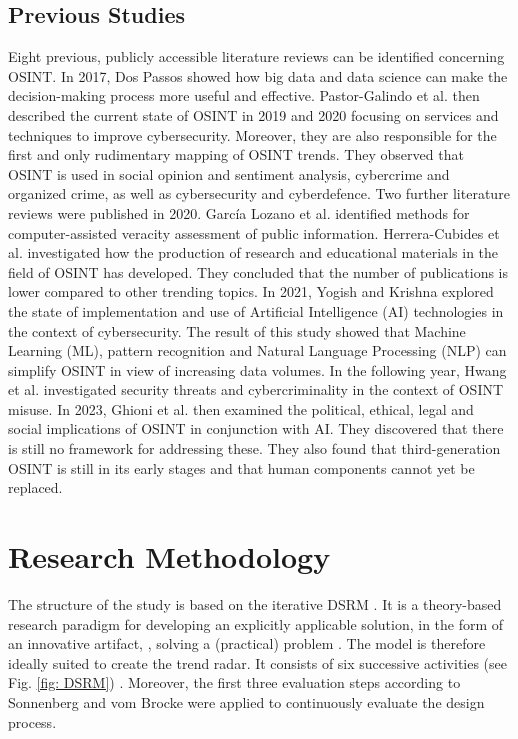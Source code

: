 \documentclass[10pt]{article}
\begin{document}
\subsection{Previous Studies}

Eight previous, publicly accessible literature reviews can be identified
concerning OSINT. In 2017, Dos Passos \cite{DosPassos.2017} showed how big data and data science can
make the decision-making process more useful and effective. Pastor-Galindo et al. then described
the current state of OSINT in 2019 \cite{PastorGalindo.2019} and 2020 \cite{PastorGalindo.2020}
focusing on services and techniques to improve cybersecurity. Moreover, they are also responsible
for the first and only rudimentary mapping of OSINT trends. They observed that OSINT is used in
social opinion and sentiment analysis, cybercrime and organized crime, as well as cybersecurity and cyberdefence.
Two further literature reviews were published in 2020. García Lozano et al. \cite{GarciaLozano.2020} identified
methods for computer-assisted veracity assessment of public information.
Herrera-Cubides et al. \cite{HerreraCubides.2020} investigated how the production of
research and educational materials in the field of OSINT has developed. They concluded that
the number of publications is lower compared to other trending topics. In 2021,
Yogish and Krishna \cite{Yogish.2021} explored the state of implementation and use of
Artificial Intelligence (AI) technologies in the context of cybersecurity. The result of this
study showed that Machine Learning (ML), pattern recognition and Natural Language Processing
(NLP) can simplify OSINT in view of increasing data volumes. In the following year, Hwang et al.
\cite{Hwang.2022} investigated security threats and cybercriminality in the context of OSINT misuse.
In 2023, Ghioni et al. \cite{Ghioni.2023} then examined the political, ethical, legal and social implications of
OSINT in conjunction with AI. They discovered that there is still no framework
for addressing these. They also found that third-generation OSINT is still in its early
stages and that human components cannot yet be replaced.

\section{Research Methodology}

The structure of the study is based on the iterative DSRM \cite{Peffers.2007}. It is a theory-based
research paradigm for developing an explicitly applicable solution, in the form of an innovative artifact,
\cite{vomBrocke.2020b}, solving a (practical) problem \cite{Peffers.2007,Hevner.2004}. The model is therefore ideally suited to
create the trend radar. It consists of six successive activities (see Fig. \ref{fig: DSRM}) \cite{Peffers.2007}.
Moreover, the first three evaluation steps according to Sonnenberg and vom Brocke \cite{Sonnenberg.2012}
were applied to continuously evaluate the design process.
\end{document}
